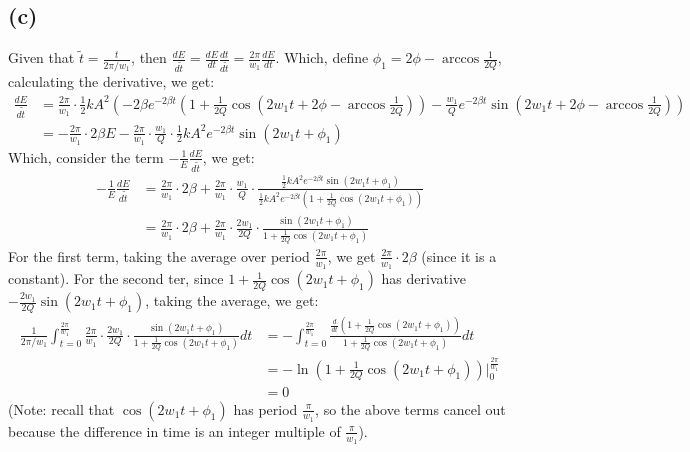 \documentclass{article}
\begin{document}
\subsection*{(c)}
Given that $\tilde{t}=\frac{t}{2\pi/w_1}$, then $\frac{dE}{d\tilde{t}} = \frac{dE}{dt}\frac{dt}{d\tilde{t}} = \frac{2\pi}{w_1}\frac{dE}{dt}$. Which, define $\phi_1 = 2\phi-\arccos\frac{1}{2Q}$, calculating the derivative, we get:
\begin{align}
    \frac{dE}{d\tilde{t}} &= \frac{2\pi}{w_1}\cdot \frac{1}{2}kA^2\left(-2\beta e^{-2\beta t}\left(1+\frac{1}{2Q}\cos\left(2w_1t+2\phi-\arccos\frac{1}{2Q}\right)\right) -\frac{w_1}{Q}e^{-2\beta t}\sin\left(2w_1t+2\phi-\arccos\frac{1}{2Q}\right)\right)\\
    &= -\frac{2\pi}{w_1}\cdot 2\beta E-\frac{2\pi}{w_1}\cdot \frac{w_1}{Q}\cdot\frac{1}{2}kA^2e^{-2\beta t}\sin\left(2w_1t+\phi_1\right)
\end{align}
Which, consider the term $-\frac{1}{E}\frac{dE}{d\tilde{t}}$, we get:
\begin{align}
    -\frac{1}{E}\frac{dE}{d\tilde{t}} &= \frac{2\pi}{w_1}\cdot 2\beta +\frac{2\pi}{w_1}\cdot \frac{w_1}{Q}\cdot\frac{\frac{1}{2}kA^2e^{-2\beta t}\sin(2w_1t+\phi_1)}{\frac{1}{2}kA^2e^{-2\beta t}\left(1+\frac{1}{2Q}\cos\left(2w_1t+\phi_1\right)\right)}\\
    &= \frac{2\pi}{w_1}\cdot 2\beta+\frac{2\pi}{w_1}\cdot\frac{2w_1}{2Q}\cdot\frac{\sin(2w_1t+\phi_1)}{1+\frac{1}{2Q}\cos(2w_1t+\phi_1)}
\end{align}
For the first term, taking the average over period $\frac{2\pi}{w_1}$, we get $\frac{2\pi}{w_1}\cdot 2\beta$ (since it is a constant). For the second ter, since $1+\frac{1}{2Q}\cos(2w_1t+\phi_1)$ has derivative $-\frac{2w_1}{2Q}\sin(2w_1t+\phi_1)$, taking the average, we get:
\begin{align}
    \frac{1}{2\pi/w_1}\int_{t=0}^\frac{2\pi}{w_1}\frac{2\pi}{w_1}\cdot\frac{2w_1}{2Q}\cdot\frac{\sin(2w_1t+\phi_1)}{1+\frac{1}{2Q}\cos(2w_1t+\phi_1)} dt &= -\int_{t=0}^{\frac{2\pi}{w_1}}\frac{\frac{d}{dt}\left(1+\frac{1}{2Q}\cos(2w_1t+\phi_1)\right)}{1+\frac{1}{2Q}\cos(2w_1t+\phi_1)}dt\\
    &= -\ln\left(1+\frac{1}{2Q}\cos(2w_1t+\phi_1)\right)\bigg|_{0}^{\frac{2\pi}{w_1}}\\
    &= 0
\end{align}
(Note: recall that $\cos(2w_1t+\phi_1)$ has period $\frac{\pi}{w_1}$, so the above terms cancel out because the difference in time is an integer multiple of $\frac{\pi}{w_1}$).
 
\end{document}
